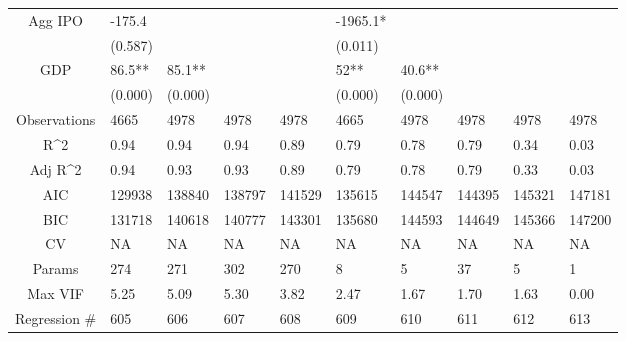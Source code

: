 \documentclass{article}
\begin{document}
\begin{table}[H]
\begin{tabular}{|clllllllll|}
  Agg IPO & -175.4 &  &  &  & -1965.1* &  &  &  &  \\ 
   & (0.587) &  &  &  & (0.011) &  &  &  &  \\ 
  GDP & 86.5** & 85.1** &  &  & 52** & 40.6** &  &  &  \\ 
   & (0.000) & (0.000) &  &  & (0.000) & (0.000) &  &  &  \\ 
  \hline 
 Observations & 4665 & 4978 & 4978 & 4978 & 4665 & 4978 & 4978 & 4978 & 4978 \\ 
  R^2 & 0.94 & 0.94 & 0.94 & 0.89 & 0.79 & 0.78 & 0.79 & 0.34 & 0.03 \\ 
  Adj R^2 & 0.94 & 0.93 & 0.93 & 0.89 & 0.79 & 0.78 & 0.79 & 0.33 & 0.03 \\ 
  AIC & 129938 & 138840 & 138797 & 141529 & 135615 & 144547 & 144395 & 145321 & 147181 \\ 
  BIC & 131718 & 140618 & 140777 & 143301 & 135680 & 144593 & 144649 & 145366 & 147200 \\ 
  CV & NA & NA & NA & NA & NA & NA & NA & NA & NA \\ 
  Params & 274 & 271 & 302 & 270 & 8 & 5 & 37 & 5 & 1 \\ 
  Max VIF & 5.25 & 5.09 & 5.30 & 3.82 & 2.47 & 1.67 & 1.70 & 1.63 & 0.00 \\ 
  Regression \# & 605 & 606 & 607 & 608 & 609 & 610 & 611 & 612 & 613 \\ 
   \hline
\end{tabular}
 
\end{table}
\end{document}
